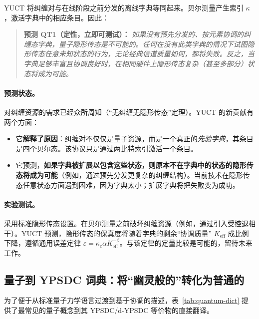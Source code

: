\documentclass[12pt,a4paper]{article}
\theoremstyle{remark}
\begin{document}
	YUCT 将纠缠对与在线阶段之前分发的离线字典等同起来。贝尔测量产生索引 $\kappa$，激活字典中的相应条目。因此：
	
	\begin{quote}
		\textbf{预测 QT1（定性，立即可测试）：}
		\emph{如果没有预先分发的、按元素协调的纠缠态字典，量子隐形传态是不可能的。任何在没有此类字典的情况下试图隐形传态任意未知状态的行为，无论经典信道质量如何，都将失败。反之，当字典足够丰富且协调良好时，在相同硬件上隐形传态复杂（甚至多部分）状态将成为可能。}
	\end{quote}
	
	\paragraph{预测状态。}
	对纠缠资源的需求已经众所周知（“无纠缠无隐形传态”定理）。YUCT 的新贡献有两个方面：
	
	\begin{itemize}
		\item 它\textbf{解释了原因}：纠缠对不仅仅是量子资源，而是一个真正的\emph{先验字典}，其条目是四个贝尔态。该协议只是通过两比特索引激活一个条目。
		\item 它预测，\textbf{如果字典被扩展以包含这些状态，则原本不在字典中的状态的隐形传态将成为可能}（例如，通过预先分发更复杂的纠缠结构）。当前技术在隐形传态任意状态方面遇到困难，因为字典太小；扩展字典将把失败变为成功。
	\end{itemize}
	
	\paragraph{实验测试。}
	采用标准隐形传态设置。在贝尔测量之前破坏纠缠资源（例如，通过引入受控退相干）。YUCT 预测，隐形传态的保真度将随着字典的剩余“协调质量” $K_{\mathrm{eff}}$ 成比例下降，遵循通用误差定律 $\varepsilon = \kappa_c \alpha K_{\mathrm{eff}}^{-\beta}$。与该定律的定量比较是可能的，留待未来工作。
	
	\subsection{量子到 YPSDC 词典：将“幽灵般的”转化为普通的}
	
	为了便于从标准量子力学语言过渡到基于协调的描述，表~\ref{tab:quantum-dict} 提供了最常见的量子概念到其 YPSDC/d-YPSDC 等价物的直接翻译。
	
\end{document}
